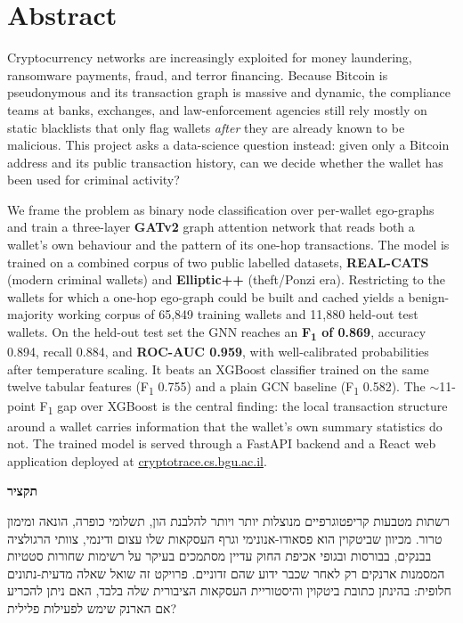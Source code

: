 \documentclass[12pt,a4paper,openany]{report}
\newcommand{\heb}[1]{{\hebrewfont\beginR #1\endR}}
\newcommand{\hebpar}[1]{{\raggedleft\hebrewfont\beginR #1\endR\par}}
\newcommand{\live}{\href{https://cryptotrace.cs.bgu.ac.il/}{cryptotrace.cs.bgu.ac.il}}
\begin{document}
\chapter*{Abstract}
Cryptocurrency networks are increasingly exploited for money laundering, ransomware
payments, fraud, and terror financing. Because Bitcoin is pseudonymous and its transaction
graph is massive and dynamic, the compliance teams at banks, exchanges, and
law-enforcement agencies still rely mostly on static blacklists that only flag wallets
\emph{after} they are already known to be malicious. This project asks a data-science
question instead: given only a Bitcoin address and its public transaction history, can we
decide whether the wallet has been used for criminal activity?

We frame the problem as binary node classification over per-wallet ego-graphs and train a
three-layer \textbf{GATv2} graph attention network that reads both a wallet's own behaviour
and the pattern of its one-hop transactions. The model is trained on a combined corpus of two
public labelled datasets, \textbf{REAL-CATS} (modern criminal wallets) and
\textbf{Elliptic++} (theft/Ponzi era). Restricting to the wallets for which a one-hop
ego-graph could be built and cached yields a benign-majority working corpus of 65{,}849
training wallets and 11{,}880 held-out test wallets. On the held-out test set the GNN reaches an \textbf{F\textsubscript{1}
of 0.869}, accuracy 0.894, recall 0.884, and \textbf{ROC-AUC 0.959}, with well-calibrated
probabilities after temperature scaling. It beats an XGBoost classifier trained on the same
twelve tabular features (F\textsubscript{1} 0.755) and a plain GCN baseline
(F\textsubscript{1} 0.582). The $\sim$11-point F\textsubscript{1} gap over XGBoost is the
central finding: the local transaction structure around a wallet carries information that the
wallet's own summary statistics do not. The trained model is served through a FastAPI backend
and a React web application deployed at \live.

\vspace{1.4em}
{\raggedleft\LARGE\bfseries\heb{תקציר}\par}
\addcontentsline{toc}{chapter}{\heb{תקציר} (Hebrew Abstract)}
\vspace{0.5em}
\hebpar{רשתות מטבעות קריפטוגרפיים מנוצלות יותר ויותר להלבנת הון, תשלומי כופרה, הונאה ומימון טרור. מכיוון שביטקוין הוא פסאודו-אנונימי וגרף העסקאות שלו עצום ודינמי, צוותי הרגולציה בבנקים, בבורסות ובגופי אכיפת החוק עדיין מסתמכים בעיקר על רשימות שחורות סטטיות המסמנות ארנקים רק לאחר שכבר ידוע שהם זדוניים. פרויקט זה שואל שאלה מדעית-נתונים חלופית: בהינתן כתובת ביטקוין והיסטוריית העסקאות הציבורית שלה בלבד, האם ניתן להכריע אם הארנק שימש לפעילות פלילית?}
\end{document}
